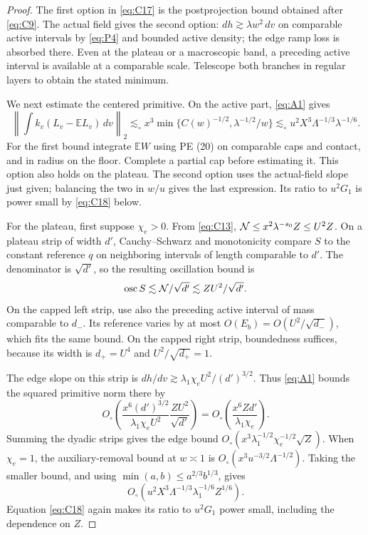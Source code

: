 \begin{proof}
The first option in \eqref{eq:C17} is the postprojection bound obtained
after \eqref{eq:C9}. The actual field gives the second option:
\(dh\gtrsim\lambda w^2\,dv\) on comparable active intervals by
\eqref{eq:P4} and bounded active density; the edge ramp loss is
absorbed there. Even at the plateau or a macroscopic band, a preceding
active interval is available at a comparable scale. Telescope both
branches in regular layers to obtain the stated minimum.

We next estimate the centered primitive. On the active part,
\eqref{eq:A1} gives
\[
 \left\|\int k_v(L_v-\mathbb EL_v)\,dv\right\|_2
 \lesssim_\circ x^3\min\{C(w)^{-1/2},\lambda^{-1/2}/w\}
 \lesssim_\circ u^2X^3\Lambda^{-1/3}\lambda^{-1/6}.
\]
For the first bound integrate \(\mathbb EW\) using PE (20) on
comparable caps and contact, and in radius on the floor. Complete a
partial cap before estimating it. This option also holds on the
plateau. The second option uses the actual-field slope just given;
balancing the two in \(w/u\) gives the last expression. Its ratio to
\(u^2G_1\) is power small by \eqref{eq:C18} below.

For the plateau, first suppose \(\chi_e>0\). From \eqref{eq:C13},
\({\cal N}\le x^2\lambda^{-s_0}Z\le U^2Z\).
On a plateau strip of width \(d'\), Cauchy--Schwarz and monotonicity
compare \(S\) to the constant reference \(q\) on neighboring
intervals of length comparable to \(d'\). The denominator is
\(\sqrt{d'}\), so the resulting oscillation bound is
\[
 \operatorname{osc}S\lesssim {\cal N}/\sqrt{d'}
          \lesssim ZU^2/\sqrt{d'}.
\]
On the capped left strip, use also the preceding active interval of
mass comparable to \(d_-\). Its reference varies by at most
\(O(E_b)=O(U^2/\sqrt{d_-})\), which fits the same bound. On the
capped right strip, boundedness suffices, because its width is
\(d_+=U^4\) and \(U^2/\sqrt{d_+}=1\).

The edge slope on this strip is
\(dh/dv\gtrsim\lambda_1\chi_e U^2/(d')^{3/2}\).
Thus \eqref{eq:A1} bounds the squared primitive norm there by
\[
 O_\circ\left(
  \frac{x^6(d')^{3/2}}{\lambda_1\chi_e U^2}
  \frac{ZU^2}{\sqrt{d'}}\right)
 =O_\circ\left(\frac{x^6Zd'}{\lambda_1\chi_e}\right).
\]
Summing the dyadic strips gives the edge bound
\(O_\circ(x^3\lambda_1^{-1/2}\chi_e^{-1/2}\sqrt Z)\).
When \(\chi_e=1\), the auxiliary-removal bound at \(w\asymp1\)
is \(O_\circ(x^3u^{-3/2}\Lambda^{-1/2})\). Taking the smaller
bound, and using \(\min(a,b)\le a^{2/3}b^{1/3}\), gives
\[
 O_\circ(u^2X^3\Lambda^{-1/3}\lambda_1^{-1/6}Z^{1/6}).
\]
Equation \eqref{eq:C18} again makes its ratio to \(u^2G_1\)
power small, including the dependence on \(Z\).


\end{proof}
